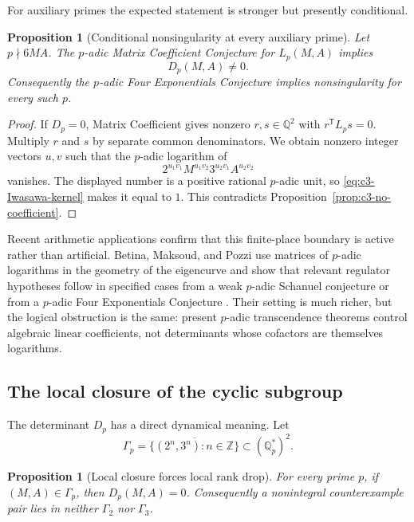 \documentclass[11pt,oneside]{article}
\newtheorem{proposition}[theorem]{Proposition}
\theoremstyle{definition}
\theoremstyle{remark}
\newcommand{\Z}{\mathbb Z}
\newcommand{\Q}{\mathbb Q}
\begin{document}
For auxiliary primes the expected statement is stronger but presently conditional.

\begin{proposition}[Conditional nonsingularity at every auxiliary prime]
\label{prop:c3-aux-MCC}
Let $p\nmid6MA$.  The $p$-adic Matrix Coefficient Conjecture for $L_p(M,A)$ implies
\[
 D_p(M,A)\ne0.
\]
Consequently the $p$-adic Four Exponentials Conjecture implies nonsingularity for every such
$p$.
\end{proposition}

\begin{proof}
If $D_p=0$, Matrix Coefficient gives nonzero $r,s\in\Q^2$ with
$r^{\mathsf T}L_p s=0$.  Multiply $r$ and $s$ by separate common denominators.  We obtain
nonzero integer vectors $u,v$ such that the $p$-adic logarithm of
\[
  2^{u_1v_1}M^{u_1v_2}3^{u_2v_1}A^{u_2v_2}
\]
vanishes.  The displayed number is a positive rational $p$-adic unit, so
\eqref{eq:c3-Iwasawa-kernel} makes it equal to $1$.  This contradicts
Proposition~\ref{prop:c3-no-coefficient}.
\end{proof}

Recent arithmetic applications confirm that this finite-place boundary is active rather than
artificial.  Betina, Maksoud, and Pozzi use matrices of $p$-adic logarithms in the geometry of
the eigencurve and show that relevant regulator hypotheses follow in specified cases from a
weak $p$-adic Schanuel conjecture or from a $p$-adic Four Exponentials Conjecture
\cite{BetinaMaksoudPozzi2026}.  Their setting is much richer, but the logical obstruction is
the same: present $p$-adic transcendence theorems control algebraic linear coefficients, not
determinants whose cofactors are themselves logarithms.

\subsection{The local closure of the cyclic subgroup}
\label{sec:c3-local-closure}

The determinant $D_p$ has a direct dynamical meaning.  Let
\[
 \Gamma_p=\overline{\{(2^n,3^n):n\in\Z\}}
 \subset(\Q_p^*)^2.
\]

\begin{proposition}[Local closure forces local rank drop]
\label{prop:c3-closure-implies-D}
For every prime $p$, if $(M,A)\in\Gamma_p$, then $D_p(M,A)=0$.
Consequently a nonintegral counterexample pair lies in neither $\Gamma_2$ nor $\Gamma_3$.
\end{proposition}
\end{document}
